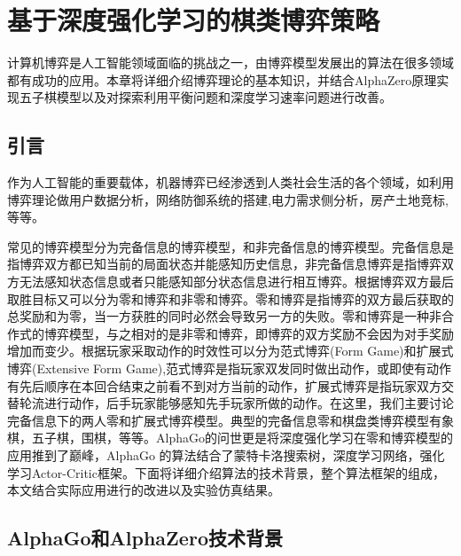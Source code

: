 \chapter{基于深度强化学习的棋类博弈策略}
计算机博弈是人工智能领域面临的挑战之一，由博弈模型发展出的算法在很多领域都有成功的应用。本章将详细介绍博弈理论的基本知识，并结合AlphaZero原理实现五子棋模型以及对探索利用平衡问题和深度学习速率问题进行改善。

\section{引言}
作为人工智能的重要载体，机器博弈已经渗透到人类社会生活的各个领域，如利用博弈理论做用户数据分析\cite{吴诚2017基于博弈论的大用户直购电双边决策研究}，网络防御系统的搭建\cite{许晓燕2018基于博弈模型的网络防御},电力需求侧分析\cite{刘晓峰2018博弈论在电力需求侧的应用研究综述}，房产土地竞标\cite{朱传军2011基于模糊测度与模糊积分的房地产评估方法与应用},等等。

常见的博弈模型分为完备信息的博弈模型，和非完备信息的博弈模型。完备信息是指博弈双方都已知当前的局面状态并能感知历史信息，非完备信息博弈是指博弈双方无法感知状态信息或者只能感知部分状态信息进行相互博弈。根据博弈双方最后取胜目标又可以分为零和博弈和非零和博弈。零和博弈是指博弈的双方最后获取的总奖励和为零，当一方获胜的同时必然会导致另一方的失败。零和博弈是一种非合作式的博弈模型，与之相对的是非零和博弈，即博弈的双方奖励不会因为对手奖励增加而变少。根据玩家采取动作的时效性可以分为范式博弈(Form Game)和扩展式博弈(Extensive Form Game),范式博弈是指玩家双发同时做出动作，或即使有动作有先后顺序在本回合结束之前看不到对方当前的动作，扩展式博弈是指玩家双方交替轮流进行动作，后手玩家能够感知先手玩家所做的动作。在这里，我们主要讨论完备信息下的两人零和扩展式博弈模型。典型的完备信息零和棋盘类博弈模型有象棋，五子棋，围棋，等等。AlphaGo的问世更是将深度强化学习在零和博弈模型的应用推到了巅峰，AlphaGo 的算法结合了蒙特卡洛搜索树，深度学习网络，强化学习Actor-Critic框架。下面将详细介绍算法的技术背景，整个算法框架的组成，本文结合实际应用进行的改进以及实验仿真结果。
\section{AlphaGo和AlphaZero技术背景}

